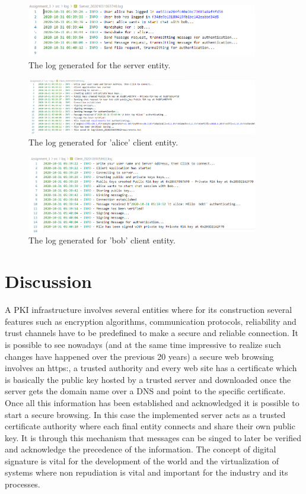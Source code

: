 \documentclass[letterpaper,12pt]{article}
\begin{document}
\begin{figure}[H]
    \centering
    \includegraphics[width=0.9\textwidth]{assets/server_log.png}
    \caption{The log generated for the server entity.}
    \label{fig:SRV}
\end{figure}
\begin{figure}[H]
    \centering
    \includegraphics[width=0.9\textwidth]{assets/alice_log.png}
    \caption{The log generated for 'alice' client entity.}
    \label{fig:ALC}
\end{figure}
\begin{figure}[H]
    \centering
    \includegraphics[width=0.9\textwidth]{assets/bob_log.png}
    \caption{The log generated for 'bob' client entity.}
    \label{fig:BOB}
\end{figure}


\section{Discussion}
A PKI infrastructure involves several entities where for its construction several features such as encryption algorithms, communication protocols, reliability and trust channels have to be predefined to make a secure and reliable connection. It is possible to see nowadays (and at the same time impressive to realize such changes have happened over the previous 20 years) a secure web browsing involves an https:, a trusted authority and every web site has a certificate which is basically the public key hosted by a trusted server and downloaded once the server gets the domain name over a DNS and point to the specific certificate. Once all this information has been established and acknowledged it is possible to start a secure browsing. In this case the implemented server acts as a trusted certificate authority where each final entity connects and share their own public key. It is through this mechanism that messages can be singed to later be verified and acknowledge the precedence of the information. The concept of digital signature is vital for the development of the world and the virtualization of systems where non repudiation is vital and important for the industry and its processes.
\end{document}

